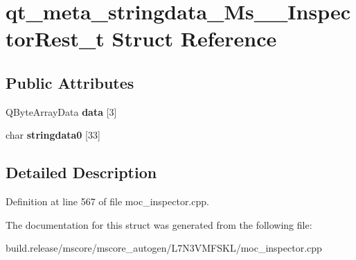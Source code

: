 \hypertarget{structqt__meta__stringdata___ms_____inspector_rest__t}{}\section{qt\+\_\+meta\+\_\+stringdata\+\_\+\+Ms\+\_\+\+\_\+\+Inspector\+Rest\+\_\+t Struct Reference}
\label{structqt__meta__stringdata___ms_____inspector_rest__t}
\subsection*{Public Attributes}
\begin{DoxyCompactItemize}
\item 
\mbox{\label{structqt__meta__stringdata___ms_____inspector_rest__t_a4119f3e410edbfcc9dacfbf7d3e659d6}} 
Q\+Byte\+Array\+Data {\bfseries data} \mbox{[}3\mbox{]}
\item 
\mbox{\label{structqt__meta__stringdata___ms_____inspector_rest__t_a7292fe3a2b1cce477f1168a0927e9bfc}} 
char {\bfseries stringdata0} \mbox{[}33\mbox{]}
\end{DoxyCompactItemize}


\subsection{Detailed Description}


Definition at line 567 of file moc\+\_\+inspector.\+cpp.



The documentation for this struct was generated from the following file\+:\begin{DoxyCompactItemize}
\item 
build.\+release/mscore/mscore\+\_\+autogen/\+L7\+N3\+V\+M\+F\+S\+K\+L/moc\+\_\+inspector.\+cpp\end{DoxyCompactItemize}
